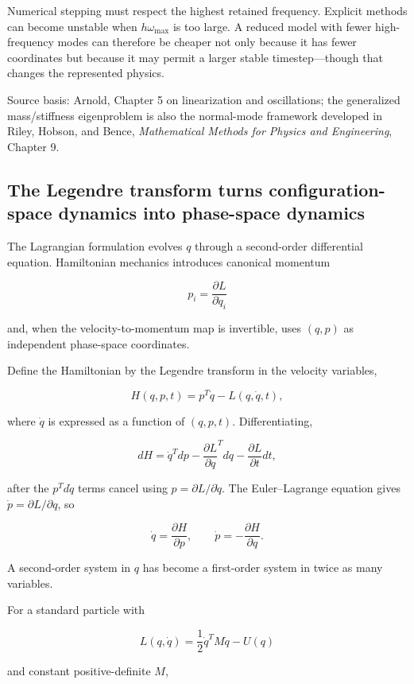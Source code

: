 Numerical stepping must respect the highest retained frequency. Explicit methods can become unstable when \(h\omega_{\max}\) is too large. A reduced model with fewer high-frequency modes can therefore be cheaper not only because it has fewer coordinates but because it may permit a larger stable timestep---though that changes the represented physics.

Source basis: Arnold, Chapter 5 on linearization and oscillations; the generalized mass/stiffness eigenproblem is also the normal-mode framework developed in Riley, Hobson, and Bence, \emph{Mathematical Methods for Physics and Engineering}, Chapter 9.

\subsection{The Legendre transform turns configuration-space dynamics into phase-space dynamics}\label{the-legendre-transform-turns-configuration-space-dynamics-into-phase-space-dynamics}

The Lagrangian formulation evolves \(q\) through a second-order differential equation. Hamiltonian mechanics introduces canonical momentum

\[
p_i
=
\frac{\partial L}{\partial\dot q_i}
\]

and, when the velocity-to-momentum map is invertible, uses \((q,p)\) as independent phase-space coordinates.

Define the Hamiltonian by the Legendre transform in the velocity variables,

\[
H(q,p,t)
=
p^T\dot q-L(q,\dot q,t),
\]

where \(\dot q\) is expressed as a function of \((q,p,t)\). Differentiating,

\[
dH
=
\dot q^Tdp
-
\frac{\partial L}{\partial q}^Tdq
-
\frac{\partial L}{\partial t}dt,
\]

after the \(p^Td\dot q\) terms cancel using \(p=\partial L/\partial\dot q\). The Euler--Lagrange equation gives \(\dot p=\partial L/\partial q\), so

\[
\boxed{
\dot q=
\frac{\partial H}{\partial p},
\qquad
\dot p=
-\frac{\partial H}{\partial q}.
}
\]

A second-order system in \(q\) has become a first-order system in twice as many variables.

For a standard particle with

\[
L(q,\dot q)
=
\frac12\dot q^TM\dot q-U(q)
\]

and constant positive-definite \(M\),

